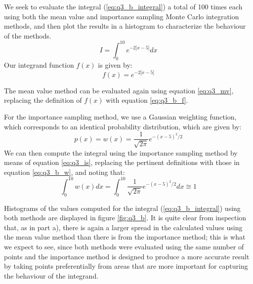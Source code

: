 \documentclass{article}
\begin{document}
We seek to evaluate the integral (\ref{eq:q3_b_integral}) a total of 100 times each using both the mean value and importance sampling Monte Carlo integration methods, and then plot the results in a histogram to characterize the behaviour of the methods.
\begin{equation}
	\label{eq:q3_b_integral}
	I = \int_0^{10} e^{-2|x-5|}dx
\end{equation}
Our integrand function $f(x)$ is given by:
\begin{equation}
	\label{eq:q3_b_f}
	f(x) = e^{-2|x-5|}
\end{equation}

The mean value method can be evaluated again using equation \ref{eq:q3_mv}, replacing the definition of $f(x)$ with equation \ref{eq:q3_b_f}.

For the importance sampling method, we use a Gaussian weighting function, which corresponds to an identical probability distribution, which are given by:
\begin{equation}
	\label{eq:q3_b_w}
	p(x) = w(x) = \frac{1}{\sqrt{2\pi}}e^{-(x-5)^2/2}
\end{equation}
We can then compute the integral using the importance sampling method by means of equation \ref{eq:q3_is}, replacing the pertinent definitions with those in equation \ref{eq:q3_b_w}, and noting that:
\begin{equation}
	\int_0^{10} w(x)dx = \int_0^{10} \frac{1}{\sqrt{2\pi}}e^{-(x-5)^2/2}dx \cong 1
\end{equation}

Histograms of the values computed for the integral (\ref{eq:q3_b_integral}) using both methods are displayed in figure \ref{fig:q3_b}. It is quite clear from inspection that, as in part a), there is again a larger spread in the calculated values using the mean value method than there is from the importance method; this is what we expect to see, since both methods were evaluated using the same number of points and the importance method is designed to produce a more accurate result by taking points preferentially from areas that are more important for capturing the behaviour of the integrand.
\end{document}
